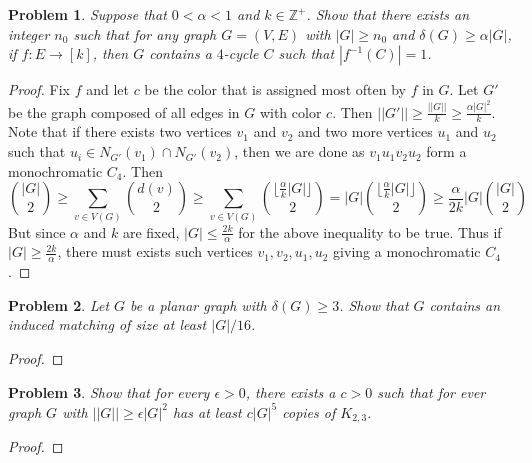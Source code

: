 \documentclass[12pt]{article}
\newtheorem{problem}{Problem}
\begin{document}
\begin{problem} Suppose that $0 < \alpha < 1$ and
  $k \in \mathbb{Z}^+$. Show that there exists an integer $n_0$ such
  that for any graph $G=(V,E)$ with $|G| \geq n_0$ and
  $\delta(G) \geq \alpha|G|$, if $f: E \to [k]$, then $G$ contains a
  $4$-cycle $C$ such that $|f^{-1}(C)| = 1$.
\end{problem}
\begin{proof} Fix $f$ and let $c$ be the color that is assigned most
  often by $f$ in $G$. Let $G'$ be the graph composed of all edges in
  $G$ with color $c$. Then
  $||G'|| \geq \frac{||G||}{k} \geq \frac{\alpha |G|^2}{k}$.  Note
  that if there exists two vertices $v_1$ and $v_2$ and two more
  vertices $u_1$ and $u_2$ such that
  $u_i \in N_{G'}(v_1) \cap N_{G'}(v_2)$, then we are done as
  $v_1u_1v_2u_2$ form a monochromatic $C_4$. Then
  \[
    {|G| \choose 2} \geq \sum_{v \in V(G)} {d(v) \choose 2} \geq
    \sum_{v \in V(G)} {\lfloor \frac{\alpha}{k} |G| \rfloor \choose 2}
    = |G|{\lfloor \frac{\alpha}{k} |G| \rfloor \choose 2} \geq
    \frac{\alpha}{2k} |G| {|G| \choose 2}
  \]
  But since $\alpha$ and $k$ are fixed, $|G| \leq \frac{2k}{\alpha}$
  for the above inequality to be true. Thus if
  $|G| \geq \frac{2k}{\alpha}$, there must exists such vertices
  $v_1, v_2, u_1, u_2$ giving a monochromatic $C_4$.
\end{proof}

\begin{problem} Let $G$ be a planar graph with $\delta(G) \geq
  3$. Show that $G$ contains an induced matching of size at least
  $|G| / 16$.
\end{problem}
\begin{proof}
\end{proof}

\begin{problem} Show that for every $\epsilon > 0$, there exists a
  $c > 0$ such that for ever graph $G$ with
  $||G|| \geq \epsilon |G|^2$ has at least $c |G|^5$ copies of
  $K_{2,3}$.
\end{problem}
\begin{proof}
\end{proof}
\end{document}
